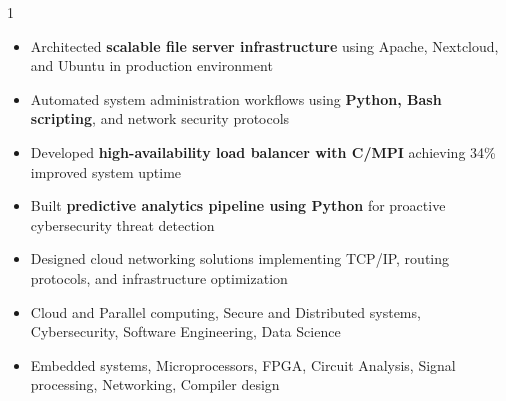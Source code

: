 \documentclass[11pt,a4paper,ragged2e]{altacv}
\begin{document}
\begin{paracol}{1}
\begin{itemize}
\item Architected \textbf{scalable file server infrastructure} using Apache, Nextcloud, and Ubuntu in production environment
\item Automated system administration workflows using \textbf{Python, Bash scripting}, and network security protocols
\item Developed \textbf{high-availability load balancer with C/MPI} achieving 34\% improved system uptime
\item Built \textbf{predictive analytics pipeline using Python} for proactive cybersecurity threat detection
\item Designed cloud networking solutions implementing TCP/IP, routing protocols, and infrastructure optimization
\end{itemize}

\medskip

\begin{itemize} 
\item Cloud and Parallel computing, Secure and Distributed systems, Cybersecurity, Software Engineering, Data Science
\item Embedded systems, Microprocessors, FPGA, Circuit Analysis, Signal processing, Networking,  Compiler design
\end{itemize}





\end{paracol}
\end{document}
